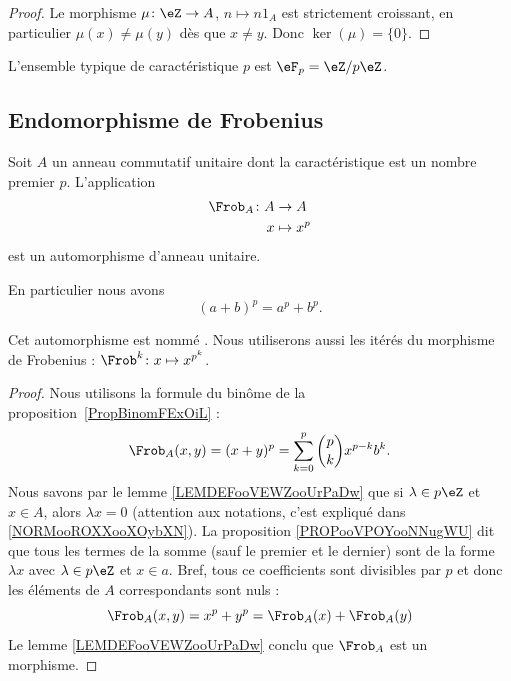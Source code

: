 \begin{proof}
	Le morphisme \( \mu\colon \eZ\to A\), \( n\mapsto n 1_A\) est strictement croissant, en particulier \( \mu(x)\neq \mu(y)\) dès que \( x\neq y\). Donc \( \ker(\mu)=\{ 0 \}\).
\end{proof}

L'ensemble typique de caractéristique \( p\) est \( \eF_p=\eZ/p\eZ\).


\subsection{Endomorphisme de Frobenius}


\begin{proposition} \label{PropFrobHAMkTY}
	Soit \( A\) un anneau commutatif unitaire dont la caractéristique est un nombre premier \( p\). L'application
	\begin{equation}
		\begin{aligned}
			\Frob_A\colon A & \to A       \\
			x               & \mapsto x^p
		\end{aligned}
	\end{equation}
	est un automorphisme d'anneau unitaire.

	En particulier nous avons
	\begin{equation}
		(a+b)^p=a^p+b^p.
	\end{equation}

	Cet automorphisme est nommé . Nous utiliserons aussi les itérés du morphisme de Frobenius : \( \Frob^k\colon x\mapsto x^{p^k}\).
\end{proposition}

\begin{proof}
	Nous utilisons la formule du binôme de la proposition~\ref{PropBinomFExOiL} :
	\begin{equation}
		\Frob_A(x,y)=(x+y)^p=\sum_{k=0}^p\binom{ p }{ k }x^{p-k}b^k.
	\end{equation}
	Nous savons par le lemme \ref{LEMDEFooVEWZooUrPaDw} que si \( \lambda\in p\eZ\) et \( x\in A\), alors \( \lambda x=0\) (attention aux notations, c'est expliqué dans \ref{NORMooROXXooXOybXN}). La proposition \ref{PROPooVPOYooNNugWU} dit que tous les termes de la somme (sauf le premier et le dernier) sont de la forme \( \lambda x\) avec \( \lambda\in p\eZ\) et \( x\in a\). Bref, tous ce coefficients sont divisibles par \( p\) et donc les éléments de \( A\) correspondants sont nuls :
	\begin{equation}
		\Frob_A(x,y)=x^p+y^p=\Frob_A(x)+\Frob_A(y)
	\end{equation}
	Le lemme \ref{LEMDEFooVEWZooUrPaDw} conclu que \( \Frob_A\) est un morphisme.
\end{proof}


